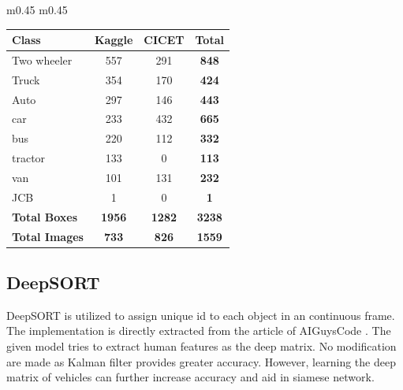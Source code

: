 \begin{table}[!ht]
\begin{tabular}{m{0.45\linewidth} m{0.45\linewidth}}
		 \begin{tabular}{|l|c|c||c|}
		 	\hline
		 	\textbf{Class}        & \textbf{Kaggle} & \textbf{CICET} & \textbf{Total} \\ \hline
		 	Two wheeler           & 557             & 291            & \textbf{848}   \\ \hline
		 	Truck                 & 354             & 170            & \textbf{424}   \\ \hline
		 	Auto                  & 297             & 146            & \textbf{443}   \\ \hline
		 	car                   & 233             & 432            & \textbf{665}   \\ \hline
		 	bus                   & 220             & 112            & \textbf{332}   \\ \hline
		 	tractor               & 133             & 0              & \textbf{113}   \\ \hline
		 	van                   & 101             & 131            & \textbf{232}   \\ \hline
		 	JCB                   & 1               & 0              & \textbf{1}     \\ \hline \hline
		 	\textbf{Total Boxes}  & \textbf{1956}   & \textbf{1282}  & \textbf{3238}  \\ \hline
		 	\textbf{Total Images} & \textbf{733}    & \textbf{826}   & \textbf{1559}  \\ \hline
		 \end{tabular}
		 \label{tab:dataset_sum1}
	\end{tabular}
\end{table}

\subsection{DeepSORT}
DeepSORT is utilized to assign unique id to each object in an continuous frame. The implementation is directly extracted from the article of AIGuysCode \cite{theaiguyscode_deepsort}. The given model tries to extract human features as the deep matrix. No modification are made as Kalman filter provides greater accuracy. However, learning the deep matrix of vehicles can further increase accuracy and aid in siamese network.

